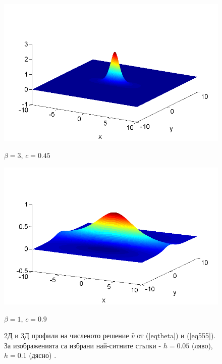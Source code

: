 \documentclass{article}
\newcommand{\rf}[1]{(\ref{#1})}
\theoremstyle{remark}
\begin{document}
\begin{figure}[ht]
\begin{minipage}[b]{0.5\linewidth}
		\includegraphics[width=\linewidth]{SolutionView/ChristovIC_30_bt3_c045_prpview.png}		
		\centerline{$\beta = 3$, $c = 0.45$ }
	\end{minipage}
	\begin{minipage}[b]{0.5\linewidth}
		 \raggedright
		\includegraphics[width=\linewidth]{SolutionView/ChristovIC_128_bt1_c090_prpview.png}
		\centerline{$\beta = 1$, $c = 0.9$}
	\end{minipage}
	\caption{2Д и 3Д профили на численото решение $\widehat v$ от \rf{eqtheta} и \rf{eq555}. За изображенията са избрани най-ситните стъпки - $h=0.05$ (ляво), $h=0.1$ (дясно) .}
	\label{fig:solutions}
\end{figure}
\FloatBarrier
\end{document}
